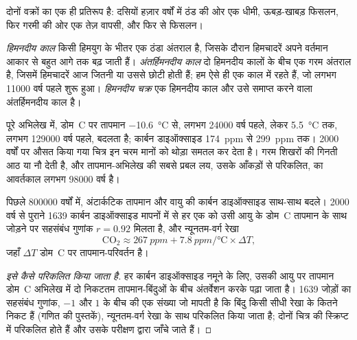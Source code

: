 दोनों वक्रों का एक ही प्रतिरूप है: दसियों हज़ार वर्षों में ठंड की ओर एक धीमी,
ऊबड़-खाबड़ फिसलन, फिर गरमी की ओर एक तेज़ वापसी, और फिर
से फिसलन।

\begin{definition}\label{def:g12:past-climates:glacial-cycle}
\emph{हिमनदीय काल} किसी हिमयुग के भीतर एक ठंडा अंतराल
है, जिसके दौरान हिमचादरें अपने वर्तमान आकार से बहुत आगे तक बढ़ जाती हैं।
\emph{अंतर्हिमनदीय काल} दो हिमनदीय कालों के बीच
एक गरम अंतराल है, जिसमें हिमचादरें आज जितनी या उससे छोटी होती हैं; हम ऐसे ही एक काल में रहते हैं,
जो लगभग \num{11000} वर्ष पहले शुरू हुआ। \emph{हिमनदीय
चक्र} एक हिमनदीय काल और उसे समाप्त करने वाला
अंतर्हिमनदीय काल है।
\end{definition}

पूरे अभिलेख में, डोम~C पर तापमान
\qty{-10.6}{\degreeCelsius} से, लगभग \num{24000} वर्ष पहले, लेकर
\qty{+5.5}{\degreeCelsius} तक, लगभग \num{129000} वर्ष पहले, बदलता है; कार्बन डाइऑक्साइड
\qty{174}{ppm} से \qty{299}{ppm} तक। \num{2000} वर्षों पर औसत किया गया चित्र
इन चरम मानों को थोड़ा समतल कर देता है। गरम शिखरों की गिनती आठ
या नौ  देती है, और तापमान-अभिलेख की सबसे प्रबल लय,
उसके आँकड़ों से परिकलित, का आवर्तकाल लगभग \num{98000} वर्ष है।

\begin{proposition}\label{prop:g12:past-climates:correlation}
पिछले \num{800000} वर्षों में, अंटार्कटिक तापमान और वायु की कार्बन
डाइऑक्साइड साथ-साथ बदले। \num{2000} वर्ष से पुराने 1639 कार्बन डाइऑक्साइड
मापनों में से हर एक को उसी आयु के डोम~C तापमान के साथ
जोड़ने पर सहसंबंध गुणांक $r = 0.92$ मिलता है, और
न्यूनतम-वर्ग रेखा
\[
  \mathrm{CO_2} \approx \qty{267}{ppm} + \qty{7.8}{ppm/\degreeCelsius} \times \Delta T ,
\]
जहाँ $\Delta T$ डोम~C पर तापमान-परिवर्तन है।
\end{proposition}

\begin{proof}[इसे कैसे परिकलित किया जाता है]
हर कार्बन डाइऑक्साइड नमूने के लिए, उसकी आयु पर तापमान
डोम~C अभिलेख में दो निकटतम तापमान-बिंदुओं के बीच अंतर्वेशन करके पढ़ा जाता है।
1639 जोड़ों का सहसंबंध गुणांक, $-1$ और $1$ के बीच की एक संख्या
जो मापती है कि बिंदु किसी सीधी रेखा के कितने निकट हैं (गणित की
पुस्तकें), न्यूनतम-वर्ग रेखा के साथ परिकलित किया जाता है; दोनों
चित्र की स्क्रिप्ट में परिकलित होते हैं और उसके परीक्षण द्वारा जाँचे जाते हैं।
\end{proof}

